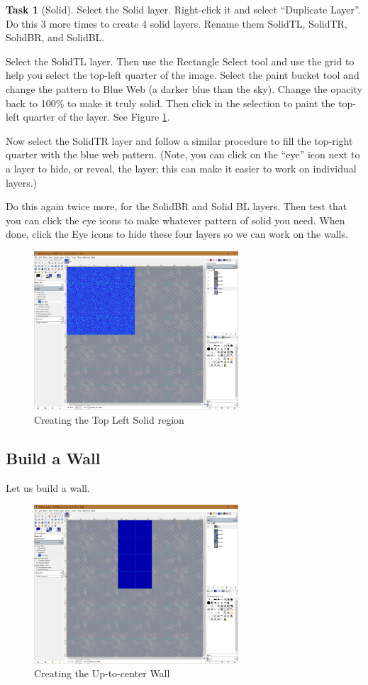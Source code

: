 \documentclass[12pt]{amsbook}
\theoremstyle{definition}
\newtheorem{task}[exercise]{Task}
\theoremstyle{remark}
\numberwithin{figure}{chapter}
\numberwithin{table}{chapter}
\numberwithin{section}{chapter}
\numberwithin{equation}{section}
\begin{document}
\begin{task}[Solid]
Select the Solid layer.  Right-click it and select ``Duplicate Layer''.  Do this 3 more times to create 4 solid layers.  Rename them SolidTL, SolidTR, SolidBR, and SolidBL.

Select the SolidTL layer.  Then use the Rectangle Select tool and use the grid to help you select the top-left quarter of the image.  Select the paint bucket tool and change the pattern to Blue Web (a darker blue than the sky).  Change the opacity back to 100\% to make it truly solid. Then click in the selection to paint the top-left quarter of the layer.  See Figure \ref{fig:top-left-solid}.

Now select the SolidTR layer and follow a similar procedure to fill the top-right quarter with the blue web pattern.  (Note, you can click on the ``eye'' icon next to a layer to hide, or reveal, the layer; this can make it easier to work on individual layers.)

Do this again twice more, for the SolidBR and Solid BL layers.  Then test that you can click the eye icons to make whatever pattern of solid you need.  When done, click the Eye icons to hide these four layers so we can work on the walls.
\end{task}

\begin{figure}[h]
  \includegraphics[width=3in]{TopLeftSolid.png}
  \caption{Creating the Top Left Solid region}
  \label{fig:top-left-solid}
\end{figure}

\subsection{Build a Wall}
Let us build a wall.

\begin{figure}[h]
  \includegraphics[width=3in]{UpWall.png}
  \caption{Creating the Up-to-center Wall}
  \label{fig:up-wall}
\end{figure}
  
\end{document}

